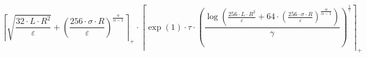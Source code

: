 \[\left\lceil \sqrt{\frac{32 \cdot L \cdot R^{2}}{\varepsilon}} + \left(\frac{256 \cdot \sigma \cdot R}{\varepsilon}\right)^{\frac{\alpha}{\alpha - 1}} \right\rceil_{+} \cdot \left\lceil \exp\left(1\right) \cdot \tau \cdot \left(\frac{\log\left(\frac{256 \cdot L \cdot R^{2}}{\varepsilon} + 64 \cdot \left(\frac{256 \cdot \sigma \cdot R}{\varepsilon}\right)^{\frac{\alpha}{\alpha - 1}}\right)}{\gamma}\right)^{\frac{1}{\gamma}} \right\rceil_{+}\]
